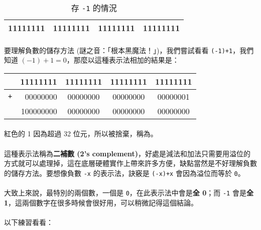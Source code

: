 \documentclass[12pt,a4paper,oneside]{report}
\begin{document}
\begin{CJK}{UTF8}{bkai}
\begin{table}[h!]
\centering
\begin{tabular}{|c|c|c|c|}
\hline
\textbf{1}1111111 & 11111111 & 11111111 & 11111111\\
\hline
\end{tabular}
\caption{存 \lstinline!-1! 的情況}
\label{basic:cpp:table:int:-1}
\end{table}

\paragraph{}要理解負數的儲存方法 (謎之音：「根本黑魔法！」)，我們嘗試看看 \lstinline!(-1)+1!，我們知道 $(-1)+1=0$，那麼以這種表示法相加的結果是：

\begin{table}[h!]
\centering
\begin{tabular}{|c|r|c|c|c|}
\hline
 & 11111111 & 11111111 & 11111111 & 11111111\\
\hline
\lstinline!+! & 00000000 & 00000000 & 00000000 & 00000001\\
\hline
\hline
 & {\color{red}1}00000000 & 00000000 & 00000000 & 00000000\\
\hline
\end{tabular}
\end{table}

\paragraph{}紅色的 {\color{red}1} 因為超過 32 位元，所以被捨棄，稱為。
\paragraph{}這種表示法稱為\textbf{二補數 (2's complement)}，好處是減法和加法只需要用溢位的方式就可以處理掉，這在底層硬體實作上帶來許多方便，缺點當然是不好理解負數的儲存方法。要想像負數 \lstinline!-x! 的表示法，訣竅是 \lstinline!(-x)+x! 會因為溢位而等於 \lstinline!0!。
\paragraph{}大致上來說，最特別的兩個數，一個是 \lstinline!0!，在此表示法中會是\textbf{全 0}；而 \lstinline!-1! 會是\textbf{全 1}，這兩個數字在很多時候會很好用，可以稍微記得這個結論。
\paragraph{}以下練習看看：


\end{CJK}
\end{document}
